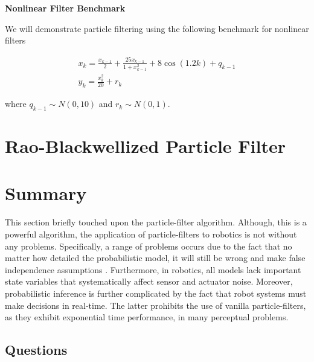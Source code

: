 \begin{framed}
\begin{exmp}{\textbf{Nonlinear Filter Benchmark}}

We will demonstrate particle filtering using the following benchmark for nonlinear filters

\begin{eqnarray}
x_k = \frac{x_{k-1}}{2} + \frac{25x_{k-1}}{1 + x_{k-1}^2} + 8 \cos(1.2k) + q_{k-1} \\
y_k = \frac{x_{k}^2}{20} + r_k
\end{eqnarray}

where $q_{k-1}\sim N(0,10)$ and $r_k \sim N(0,1)$.
\end{exmp}
\end{framed}

\section{Rao-Blackwellized Particle Filter}
\label{rao_blackwellized_particle_filter}


\section{Summary}

This section briefly touched upon the particle-filter algorithm. Although, this is a powerful algorithm, the application
of particle-filters to robotics is not without any problems. Specifically, a range of problems occurs due to  the fact that no
matter how detailed the probabilistic model, it will still be wrong and make false independence assumptions \cite{Thurn2002}. 
Furthermore, in robotics,
all models lack important state variables that systematically affect sensor and actuator noise. Moreover, 
probabilistic inference is further complicated by the fact that robot systems must make decisions in real-time. The latter 
prohibits the use of vanilla particle-filters, as they exhibit exponential time performance, in many perceptual problems.


\subsection{Questions}
\label{questions_particle_filters}

